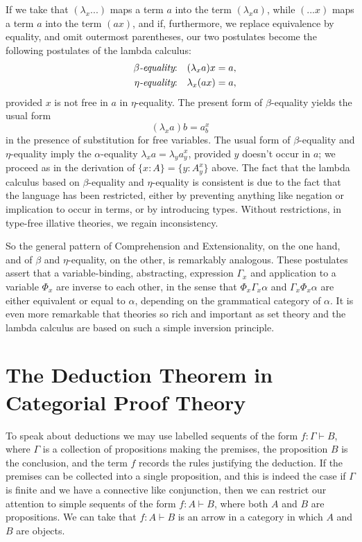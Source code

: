 \documentclass[12pt]{article}
\begin{document}
If we take that $(\lambda _{x}...)$ maps a term $a$ into the term $(\lambda
_{x}a)$, while $(...x)$ maps a term $a$ into the term $(ax)$, and if,
furthermore, we replace equivalence by equality, and omit outermost
parentheses, our two postulates become the following postulates of the
lambda calculus: 
\begin{eqnarray*}
&&\beta \text{{\it -equality}:\quad }(\lambda _{x}a)x=a, \\
&&\eta \text{{\it -equality}:\quad }\lambda _{x}(ax)=a,
\end{eqnarray*}
provided $x$ is not free in $a$ in $\eta $-equality. The present form of $%
\beta $-equality yields the usual form 
\[
(\lambda _{x}a)b=a_{b}^{x} 
\]
in the presence of substitution for free variables. The usual form of $\beta 
$-equality and $\eta $-equality imply the $\alpha $-equality $\lambda
_{x}a=\lambda _{y}a_{y}^{x}$, provided $y$ doesn't occur in $a$; we proceed
as in the derivation of $\{x:A\}=\{y:A_{y}^{x}\}$ above. The fact that the
lambda calculus based on $\beta $-equality and $\eta $-equality is
consistent is due to the fact that the language has been restricted, either
by preventing anything like negation or implication to occur in terms, or by
introducing types. Without restrictions, in type-free illative theories, we
regain inconsistency.

So the general pattern of Comprehension and Extensionality, on the one hand,
and of $\beta $ and $\eta $-equality, on the other, is remarkably analogous.
These postulates assert that a variable-binding, abstracting, expression $%
\Gamma _{x}$ and application to a variable $\Phi _{x}$ are inverse to each
other, in the sense that $\Phi _{x}\Gamma _{x}\alpha $ and $\Gamma _{x}\Phi
_{x}\alpha $ are either equivalent or equal to $\alpha $, depending on the
grammatical category of $\alpha $. It is even more remarkable that theories
so rich and important as set theory and the lambda calculus are based on
such a simple inversion principle.

\section{The Deduction Theorem in Categorial Proof Theory}

\noindent To speak about deductions we may use labelled sequents of the form 
$f:\Gamma \vdash B$, where $\Gamma $ is a collection of propositions making
the premises, the proposition $B$ is the conclusion, and the term $f$
records the rules justifying the deduction. If the premises can be collected
into a single proposition, and this is indeed the case if $\Gamma $ is
finite and we have a connective like conjunction, then we can restrict our
attention to simple sequents of the form $f:A\vdash B$, where both $A$ and $%
B $ are propositions. We can take that $f:A\vdash B$ is an arrow in a
category in which $A$ and $B$ are objects.
\end{document}
